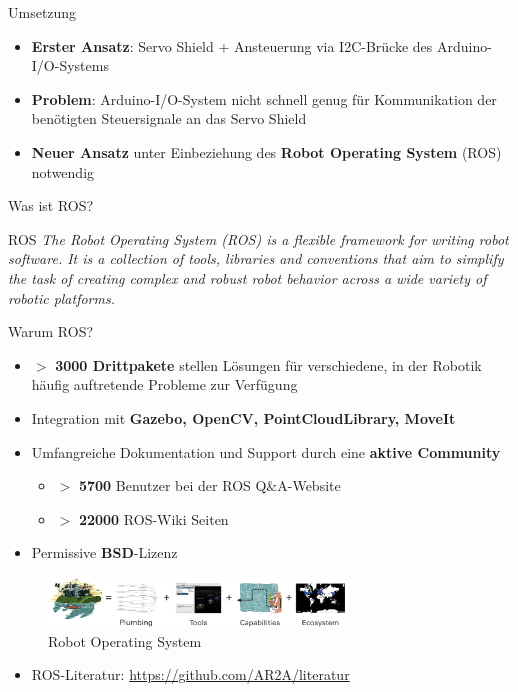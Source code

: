 \documentclass{beamer}
\begin{document}
\begin{frame}{Umsetzung}
\begin{itemize}
	\item \textbf{Erster Ansatz}: Servo Shield + Ansteuerung via I2C-Br\"ucke des Arduino-I/O-Systems
\end{itemize}
\begin{itemize}
	\item \textbf{Problem}: Arduino-I/O-System nicht schnell genug f\"ur Kommunikation der ben\"otigten Steuersignale an das Servo Shield
\end{itemize}
\begin{itemize}
	\item \textbf{Neuer Ansatz} unter Einbeziehung des \textbf{Robot Operating System} (ROS) notwendig
\end{itemize}
\end{frame}
\begin{frame}{Was ist ROS?}
\begin{alertblock}{ROS}
\textit{The Robot Operating System (ROS) is a flexible framework for writing robot software. It is a collection of tools, libraries and conventions that aim to simplify the task of creating complex and robust robot behavior across a wide variety of robotic platforms.}
\end{alertblock}
\end{frame}
\begin{frame}{Warum ROS?}
	\begin{itemize}
		\item $>$ \textbf{3000 Drittpakete} stellen L\"osungen f\"ur verschiedene, in der Robotik h\"aufig auftretende Probleme zur Verf\"ugung
		\item Integration mit \textbf{Gazebo, OpenCV, PointCloudLibrary, MoveIt}
		\item Umfangreiche Dokumentation und Support durch eine \textbf{aktive Community}
		\begin{itemize}
			\item $>$ \textbf{5700} Benutzer bei der ROS Q\&{}A-Website
			\item $>$ \textbf{22000} ROS-Wiki Seiten
		\end{itemize}
		\item Permissive \textbf{BSD}-Lizenz
	\end{itemize}
	\begin{figure}[H]
		\centering
		\includegraphics[width=0.7\textwidth]{./images/ros-equation.png}
		\caption{Robot Operating System\cite{ROS:2015:Online}}
		\label{fig:ros_equation}
	\end{figure}
	\begin{itemize}
		\item ROS-Literatur: \url{https://github.com/AR2A/literatur}
	\end{itemize}
\end{frame}
\end{document}
